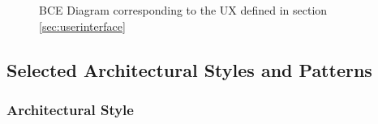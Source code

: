 \documentclass[english]{article}
\begin{document}
\begin{figure}[H]
	\centering
	\caption{BCE Diagram corresponding to the UX defined in section \ref{sec:userinterface}}
\end{figure}

\subsection{Selected Architectural Styles and Patterns}

\subsubsection{Architectural Style}
\end{document}

